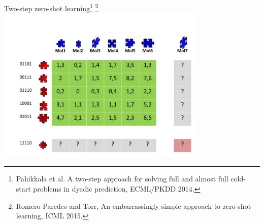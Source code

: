 \documentclass[]{beamer}
\renewcommand{\alert}[1]{\textbf{\color{putblue} #1}}
\begin{document}
%
%

\begin{frame}{Two-step zero-shot learning\footnote{Pahikkala et al. A two-step approach for solving full and almost full cold-start problems in dyadic prediction, ECML/PKDD 2014.} \footnote{Romero-Paredes and Torr, An embarrassingly simple approach to zero-shot learning, ICML 2015.}}
\vspace{0.5cm}
\includegraphics[width=0.75\textwidth,trim = 0 0 0 90,clip]{Figures/pictures/Slide8}
\end{frame}
\end{document}
